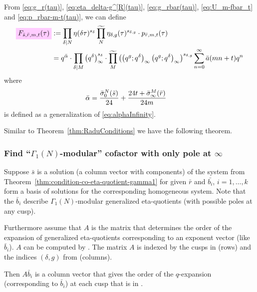 \documentclass{article}
\begin{document}
From \eqref{eq:g_r(tau)}, \eqref{eq:eta_delta-g^[R](tau)},
\eqref{eq:g_rbar(tau)}, \eqref{eq:U_m-fbar_t} and
\eqref{eq:p_rbar-m-t(tau)}, we can define
\begin{align}
  \defineNotation[F-sbar-rbar-m-t]{F_{\bar{s}, \bar{r}, m, t}(\tau)}
  &:= \divisorprod{N} \eta(\delta\tau)^{s_{\delta}}
    \genprod[N] \eta_{\delta,g}(\tau)^{s_{\delta,g}}
    \cdot p_{\bar{r},m,t}(\tau)
  \notag\\
  &=
    q^{\bar{\alpha}}
    \cdot
    \divisorprod{M}
    \eulerFunction{\delta}^{s_\delta}
    \cdot
    \genprod[M]
    \left(
    \qPochhammer{q^g}{q^\delta} \qPochhammer{q^g}{q^\delta}
    \right)^{s_{\delta,g}}
    \sum_{n=0}^\infty \bar{a}(mn+t) q^n
    \label{eq:F_sbar-rbar-m-t(tau)}
\end{align}
where
\begin{align}
  \bar{\alpha}
  &=
    \frac{\sigmazerobar[N]{\bar{s}}}{24}
    +
    \frac{24t+\sigmainftybar[M]{\bar{r}}}{24m}
    \label{eq:alphabarInfinity}
\end{align}
is defined as a generalization of \eqref{eq:alphaInfinity}.

Similar to Theorem~\ref{thm:RaduConditions} we have the following
theorem.


\subsubsection{Find ``$\Gamma_1(N)$-modular'' cofactor with only pole
  at $\infty$}

Suppose $\bar{s}$ is a solution (a column vector with 
components) of the system from
Theorem~\ref{thm:condition-co-eta-quotient-gamma1} for given $\bar{r}$
and $\bar{b_i}$, $i=1,\ldots,k$ form a basis of solutions for the
corresponding homogeneous system. Note that the $\bar{b}_i$ describe
$\Gamma_1(N)$-modular generalized eta-quotients (with possible poles
at any cusp).

Furthermore assume that $A$ is the matrix that determines the order of
the expansion of generalized eta-quotients corresponding to an
exponent vector (like $\bar{b}_i$). $A$ can be computed by
. The matrix $A$ is indexed by
the cusps in  (rows) and the indices $(\delta,g)$ from
 (columns).

Then $A \bar{b}_i$ is a column vector that gives the order of the
$q$-expansion (corresponding to $\bar{b}_i$) at each cusp that is in
.
\end{document}
